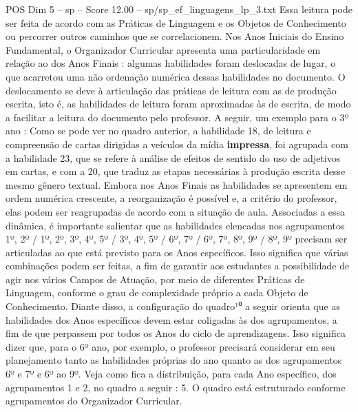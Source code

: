 \begin{textsample}{POS Dim 5 – sp – Score 12.00 – sp/sp\_ef\_linguagens\_lp\_3.txt}
Essa leitura pode ser feita de acordo com as Práticas de Linguagem e os Objetos de Conhecimento ou percorrer outros caminhos que se correlacionem.
Nos Anos Iniciais do Ensino Fundamental, o Organizador Curricular apresenta uma particularidade em relação ao dos Anos Finais : algumas habilidades foram deslocadas de lugar, o que acarretou uma não ordenação numérica dessas habilidades no documento.
O deslocamento se deve à articulação das práticas de leitura com as de produção escrita, isto é, as habilidades de leitura foram aproximadas às de escrita, de modo a facilitar a leitura do documento pelo professor.
A seguir, um exemplo para o 3º ano : Como se pode ver no quadro anterior, a habilidade 18, de leitura e compreensão de cartas dirigidas a veículos da mídia \textbf{impressa}, foi agrupada com a habilidade 23, que se refere à análise de efeitos de sentido do uso de adjetivos em cartas, e com a 20, que traduz as etapas necessárias à produção escrita desse mesmo gênero textual.
Embora nos Anos Finais as habilidades se apresentem em ordem numérica crescente, a reorganização é possível e, a critério do professor, elas podem ser reagrupadas de acordo com a situação de aula.
Associadas a essa dinâmica, é importante salientar que as habilidades elencadas nos agrupamentos 1º, 2º / 1º, 2º, 3º, 4º, 5º / 3º, 4º, 5º / 6º, 7º / 6º, 7º, 8º, 9º / 8º, 9º precisam ser articuladas ao que está previsto para os Anos específicos.
Isso significa que várias combinações podem ser feitas, a fim de garantir aos estudantes a possibilidade de agir nos vários Campos de Atuação, por meio de diferentes Práticas de Linguagem, conforme o grau de complexidade próprio a cada Objeto de Conhecimento.
Diante disso, a configuração do quadro¹⁰ a seguir orienta que as habilidades dos Anos específicos devem estar coligadas às dos agrupamentos, a fim de que perpassem por todos os Anos do ciclo de aprendizagens.
Isso significa dizer que, para o 6º ano, por exemplo, o professor precisará considerar em seu planejamento tanto as habilidades próprias do ano quanto as dos agrupamentos 6º e 7º e 6º ao 9º.
Veja como fica a distribuição, para cada Ano específico, dos agrupamentos 1 e 2, no quadro a seguir : 5.
O quadro está estruturado conforme agrupamentos do Organizador Curricular.

\end{textsample}
